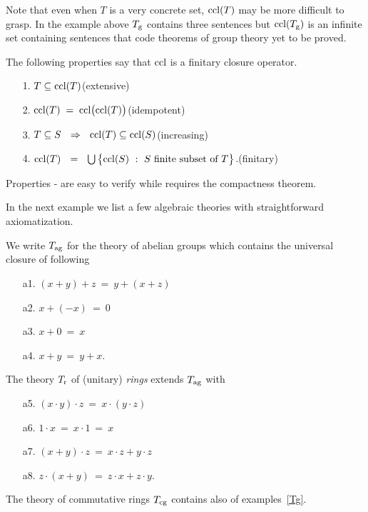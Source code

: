 Note that even when $T$ is a very concrete set, ${\rm ccl}(T)$ may be more difficult to grasp.
In the example above $T_{\rm g}$ contains three sentences but ${\rm ccl}(T_{\rm g})$ is an infinite set containing sentences that code theorems of group theory yet to be proved.

\begin{remark}
The following properties say that ${\rm ccl}$ is a finitary closure operator.
\begin{itemize}
\item[1.] $T\subseteq{\rm ccl}(T)$\hfill (extensive)
\item[2.] ${\rm ccl}(T)\;=\;{\rm ccl}\big({\rm ccl}(T)\big)$\hfill(idempotent)
\item[3.] $T\subseteq S\ \ \IMP\ \ \ccl(T)\subseteq\ccl(S)$\hfill (increasing) 
\item[4.] ${\rm ccl}(T)\ \ =\ \ \bigcup\big\{{\rm ccl}(S)\ :\ S \textrm{ finite subset of } T\big\}$.\hfill (finitary)
\end{itemize}
Properties - are easy to verify while  requires the compactness theorem.
\end{remark}

In the next example we list a few algebraic theories with straightforward axiomatization.

\begin{example}
We write $T_{\rm ag}$ for the theory of abelian groups which contains the universal closure of following
\begin{itemize}
\item[a1.] $(x+y) +z\ =\ y+(x+z)$
\item[a2.] $x+(-x)\ =\ 0$
\item[a3.] $x+0\ = \ x$
\item[a4.] $x+y\ =\ y+x$.
\end{itemize}
\end{example}

\begin{example}
The theory $T_{\rm r}$ of (unitary) \emph{rings} extends $T_{\rm ag}$ with
\begin{itemize}
\item[a5.] $(x\cdot  y)\cdot  z\  =\ x\cdot (y\cdot  z)$
\item[a6.] $1\cdot  x\ =\ x\cdot  1\ =\ x$
\item[a7.] $(x+y)\cdot  z\ =\ x\cdot  z + y\cdot  z$
\item[a8.] $z\cdot  (x+y)\ =\ z\cdot  x + z\cdot  y$.
\end{itemize}
The theory of commutative rings $T_{\rm cg}$ contains also  of examples~\ref{Tg}.
\end{example}

